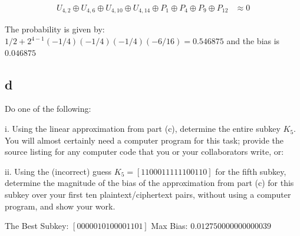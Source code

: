 \documentclass[11pt]{article}
\begin{document}
\begin{align*}
    U_{4,2} \oplus U_{4,6} \oplus U_{4,10} \oplus U_{4,14} \oplus P_1 \oplus P_4 \oplus P_9 \oplus P_ {12} &\approx 0
\end{align*}

The probability is given by: $1/2 + 2^{4-1} (-1/4) (-1/4) (-1/4) (-6/16) = 0.546875$ and the bias is $0.046875$

\subsection{d}

Do one of the following:

i. Using the linear approximation from part (c), determine the entire subkey $K_5$. You will almost certainly need a computer program for this task; provide the source listing for any computer code that you or your collaborators write, or:

ii. Using the (incorrect) guess $K_5 = [1100011111100110]$ for the ﬁfth subkey, determine the magnitude of the bias of the approximation from part (c) for this subkey over your ﬁrst ten plaintext/ciphertext pairs, without using a computer program, and show your work.

The Best Subkey: $[0 0 0 0 0 1 0 1 0 0 0 0 1 1 0 1]$
Max Bias: $0.012750000000000039$
\end{document}
